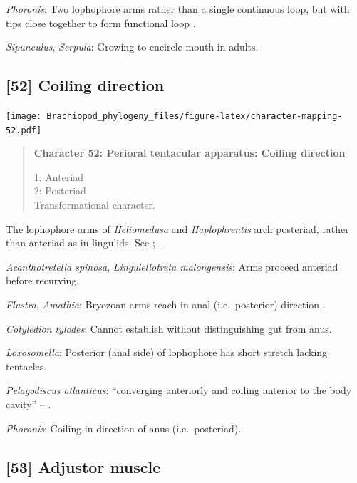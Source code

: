 \documentclass[openany]{book}
\begin{document}
\hypertarget{Phoronis-coding-51}{}
\emph{Phoronis}: Two lophophore arms rather than a single continuous
loop, but with tips close together to form functional loop
\citep{Torrey1901}.

\hypertarget{Serpula-coding-51}{}
\emph{Sipunculus}, \emph{Serpula}: Growing to encircle mouth in adults.

\subsection*{{[}52{]} Coiling direction}\label{coiling-direction}

\texttt{[image: Brachiopod\_phylogeny\_files/figure-latex/character-mapping-52.pdf]}

\begin{quote}
\textbf{Character 52: Perioral tentacular apparatus: Coiling direction}

1: Anteriad\\
2: Posteriad\\
Transformational character.
\end{quote}

The lophophore arms of \emph{Heliomedusa} and \emph{Haplophrentis} arch
posteriad, rather than anteriad as in lingulids. See
\citet{Zhang2009Architectureand}; \citet{Moysiuk2017Hyolithsare}.

\hypertarget{Acanthotretella_spinosa-coding-52}{}
\emph{Acanthotretella spinosa}, \emph{Lingulellotreta malongensis}: Arms
proceed anteriad before recurving.

\hypertarget{Amathia-coding-52}{}
\emph{Flustra}, \emph{Amathia}: Bryozoan arms reach in anal
(i.e.~posterior) direction \citep{Shunkina2015}.

\hypertarget{Cotyledion_tylodes-coding-52}{}
\emph{Cotyledion tylodes}: Cannot establish without distinguishing gut
from anus.

\hypertarget{Loxosomella-coding-52}{}
\emph{Loxosomella}: Posterior (anal side) of lophophore has short
stretch lacking tentacles.

\hypertarget{Pelagodiscus_atlanticus-coding-52}{}
\emph{Pelagodiscus atlanticus}: ``converging anteriorly and coiling
anterior to the body cavity'' -- \citet{Zhang2009Architectureand}.

\hypertarget{Phoronis-coding-52}{}
\emph{Phoronis}: Coiling in direction of anus (i.e.~posteriad).

\subsection*{{[}53{]} Adjustor muscle}\label{adjustor-muscle}
\end{document}
